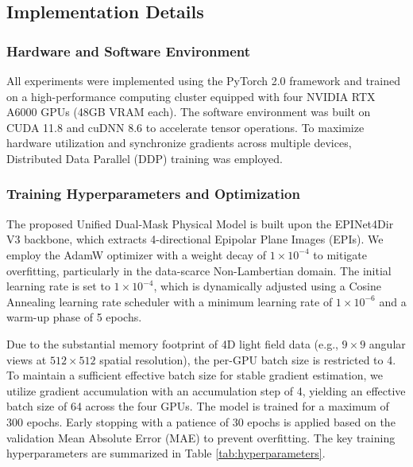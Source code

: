 \documentclass[lettersize,journal]{IEEEtran}
\begin{document}
\subsection{Implementation Details}

\subsubsection{Hardware and Software Environment}

All experiments were implemented using the PyTorch 2.0 framework and trained on a high-performance computing cluster equipped with four NVIDIA RTX A6000 GPUs (48GB VRAM each). The software environment was built on CUDA 11.8 and cuDNN 8.6 to accelerate tensor operations. To maximize hardware utilization and synchronize gradients across multiple devices, Distributed Data Parallel (DDP) training was employed. 

\subsubsection{Training Hyperparameters and Optimization}

The proposed Unified Dual-Mask Physical Model is built upon the EPINet4Dir V3 backbone, which extracts 4-directional Epipolar Plane Images (EPIs). We employ the AdamW optimizer with a weight decay of $1 \times 10^{-4}$ to mitigate overfitting, particularly in the data-scarce Non-Lambertian domain. The initial learning rate is set to $1 \times 10^{-4}$, which is dynamically adjusted using a Cosine Annealing learning rate scheduler with a minimum learning rate of $1 \times 10^{-6}$ and a warm-up phase of 5 epochs. 

Due to the substantial memory footprint of 4D light field data (e.g., $9 \times 9$ angular views at $512 \times 512$ spatial resolution), the per-GPU batch size is restricted to 4. To maintain a sufficient effective batch size for stable gradient estimation, we utilize gradient accumulation with an accumulation step of 4, yielding an effective batch size of 64 across the four GPUs. The model is trained for a maximum of 300 epochs. Early stopping with a patience of 30 epochs is applied based on the validation Mean Absolute Error (MAE) to prevent overfitting. The key training hyperparameters are summarized in Table \ref{tab:hyperparameters}.
\end{document}

